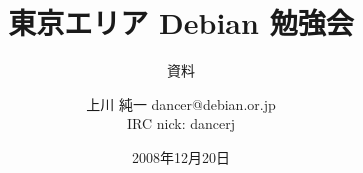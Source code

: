 




\documentclass[cjk,dvipdfmx,12pt]{beamer}
\usepackage{monthlypresentation}



\title{東京エリア Debian 勉強会}
\subtitle{資料}
\author{上川 純一 dancer@debian.or.jp\\IRC nick: dancerj}
\date{2008年12月20日}



